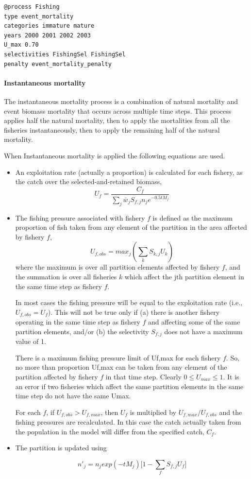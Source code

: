 {\small{\begin{verbatim}
@process Fishing
type event_mortality
categories immature mature
years 2000 2001 2002 2003
U_max 0.70
selectivities FishingSel FishingSel
penalty event_mortality_penalty
\end{verbatim}}}

\paragraph{Instantaneous mortality}
The instantaneous mortality process is a combination of natural mortality and event biomass mortality that occurs across multiple time steps. This process applies half the natural mortality, then to apply the mortalities from all the fisheries instantaneously, then to apply the remaining half of the natural mortality. 

When Instantaneous mortality is applied the following equations are used.

\begin{itemize}
	\item An exploitation rate (actually a proportion) is calculated for each fishery, as the catch over the selected-and-retained biomass,
	$$ U_f = \frac{C_f}{\sum_j \bar{w}_jS_{f,j}n_j e^{-0.5tM_j}}$$
	\item The fishing pressure associated with fishery $f$ is defined as the maximum proportion of fish taken from any element of the partition in the area affected by fishery $f$,
	$$ U_{f,obs} = max_j(\sum_k S_{k,j}U_k) $$
	where the maximum is over all partition elements affected by fishery $f$, and the summation is over all fisheries $k$ which affect the jth partition element in the same time step as fishery $f$.
	
	In most cases the fishing pressure will be equal to the exploitation rate (i.e., $U_{f,obs} = U_f$). This will not be true only if (a) there is another fishery operating in the same time step as fishery $f$ and affecting some of the same partition elements, and/or (b) the selectivity $S_{f,j}$ does not have a maximum value of 1.
	
	
	There is a maximum fishing pressure limit of Uf,max for each fishery $f$. So, no more than proportion Uf,max can be taken from any element of the partition affected by fishery $f$ in that time step. Clearly $0 \leq U_{max} \leq 1$. It is an error if two fisheries which affect the same partition elements in the same time step do not have the same Umax.
	
	
	For each $f$, if $U_{f,obs} > U_{f,max}$, then $U_f$ is multiplied by $U_{f,max}/U_{f,obs}$ and the fishing pressures are recalculated. In this case the catch actually taken from the population in the model will differ from the specified catch, $C_f$.
	
	\item The partition is updated using
	
	$$ n'_j = n_j exp(-tM_j)\big[1 - \sum_f S_{f,j} U_f \big] $$ 
\end{itemize}

